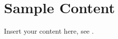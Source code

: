 \chapter{Sample Content}
\label{ch:sample}


Insert your content here, see \cite{Michel2018,ENSDF,sample.book,SampleComment,TDRSample}. 







